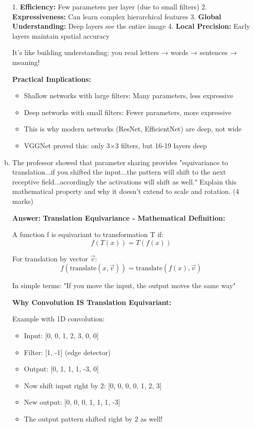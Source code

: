 \documentclass[12pt]{article}
\newcommand{\answer}[1]{{\color{answercolor}\textbf{Answer:} #1}}
\newcommand{\explanation}[1]{{\color{explanationcolor}#1}}
\begin{document}
\begin{enumerate}[(a)]
{{    1. \textbf{Efficiency:} Few parameters per layer (due to small filters)
    2. \textbf{Expressiveness:} Can learn complex hierarchical features
    3. \textbf{Global Understanding:} Deep layers see the entire image
    4. \textbf{Local Precision:} Early layers maintain spatial accuracy
    
    It's like building understanding: you read letters → words → sentences → meaning!
    }
    
    \textbf{Practical Implications:}
    \explanation{
    \begin{itemize}
        \item Shallow networks with large filters: Many parameters, less expressive
        \item Deep networks with small filters: Fewer parameters, more expressive
        \item This is why modern networks (ResNet, EfficientNet) are deep, not wide
        \item VGGNet proved this: only 3×3 filters, but 16-19 layers deep
    \end{itemize}
    }
    }
    
    \item The professor showed that parameter sharing provides "equivariance to translation...if you shifted the input...the pattern will shift to the next receptive field...accordingly the activations will shift as well." Explain this mathematical property and why it doesn't extend to scale and rotation. \hfill (4 marks)
    
    \answer{
    \textbf{Translation Equivariance - Mathematical Definition:}
    
    \explanation{
    A function f is equivariant to transformation T if:
    \[f(T(x)) = T(f(x))\]
    
    For translation by vector $\vec{v}$:
    \[f(\text{translate}(x, \vec{v})) = \text{translate}(f(x), \vec{v})\]
    
    In simple terms: "If you move the input, the output moves the same way"
    }
    
    \textbf{Why Convolution IS Translation Equivariant:}
    
    \explanation{
    Example with 1D convolution:
    \begin{itemize}
        \item Input: [0, 0, 1, 2, 3, 0, 0]
        \item Filter: [1, -1] (edge detector)
        \item Output: [0, 1, 1, 1, -3, 0]
        \item Now shift input right by 2: [0, 0, 0, 0, 1, 2, 3]
        \item New output: [0, 0, 0, 1, 1, 1, -3]
        \item The output pattern shifted right by 2 as well!
    \end{itemize}
    
}}
\end{enumerate}
\end{document}
